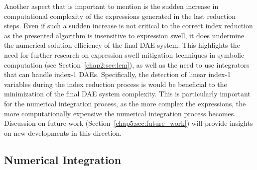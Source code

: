 Another aspect that is important to mention is the sudden increase in computational complexity of the expressions generated in the last reduction steps. Even if such a sudden increase is not critical to the correct index reduction as the presented algorithm is insensitive to expression swell, it does undermine the numerical solution efficiency of the final \ac{DAE} system. This highlights the need for further research on expression swell mitigation techniques in symbolic computation (see Section~\ref{chap2:sec:lem}), as well as the need to use integrators that can handle index-1 \acp{DAE}. Specifically, the detection of linear index-1 variables during the index reduction process is would be beneficial to the minimization of the final \ac{DAE} system complexity. This is particularly important for the numerical integration process, as the more complex the expressions, the more computationally expensive the numerical integration process becomes. Discussion on future work (Section~\ref{chap5:sec:future_work}) will provide insights on new developments in this direction.

\subsection{Numerical Integration}

